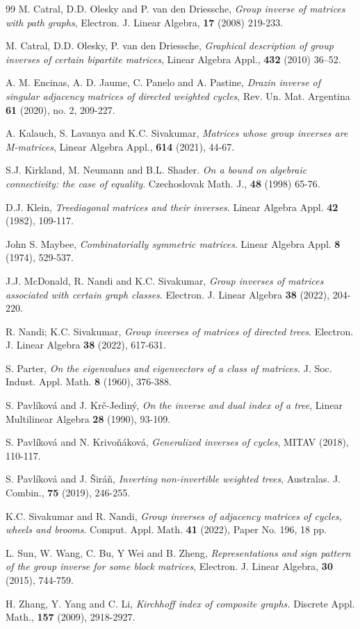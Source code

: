 \documentclass[notitlepage,12pt,reqno]{amsart}
\numberwithin{equation}{section}
\begin{document}
\begin{thebibliography}{99}
M. Catral, D.D. Olesky and P. van den Driessche, {\it Group inverse of matrices with path graphs}, Electron. J. Linear Algebra, {\bf 17} (2008) 219-233.

M. Catral, D.D. Olesky, P. van den Driessche, {\it Graphical description of group inverses of certain bipartite matrices}, Linear Algebra Appl., {\bf 432} (2010) 36–52.


A. M. Encinas, A. D. Jaume, C. Panelo and A. Pastine, {\it Drazin inverse of singular adjacency matrices of directed weighted cycles}, Rev. Un. Mat. Argentina {\bf 61} (2020), no. 2, 209-227.

A. Kalauch, S. Lavanya and K.C. Sivakumar, {\it Matrices whose group inverses are M-matrices}, Linear Algebra Appl., {\bf 614} (2021), 44-67.

S.J. Kirkland, M. Neumann and B.L. Shader. {\it On a bound on algebraic connectivity: the case of equality}. Czechoslovak Math. J., {\bf 48} (1998) 65-76.

D.J. Klein, {\it Treediagonal matrices and their inverses}. Linear Algebra Appl. {\bf 42} (1982), 109-117.

John S. Maybee, {\it Combinatorially symmetric matrices}. Linear Algebra Appl. {\bf 8} (1974), 529-537. 

J.J. McDonald, R. Nandi and K.C. Sivakumar, {\it Group inverses of matrices associated with certain graph classes}. Electron. J. Linear Algebra {\bf 38} (2022), 204-220.


R. Nandi; K.C. Sivakumar, {\it Group inverses of matrices of directed trees}. Electron. J. Linear Algebra {\bf 38} (2022), 617-631.

S. Parter, {\it On the eigenvalues and eigenvectors of a class of matrices.} J. Soc. Indust. Appl. Math. {\bf 8} (1960), 376-388.

S. Pavlíková and J. Kr\v{c}-Jedin{\'y}, {\it On the inverse and dual index of a tree}, Linear Multilinear Algebra {\bf 28} (1990), 93-109.

S. Pavl{\'i}kov{\'a} and N. Krivo\v{n}{\'a}kov{\'a}, {\it Generalized inverses of cycles}, MITAV (2018), 110-117.

S. Pavlíková and J. Širáň, {\it Inverting non-invertible weighted trees}, Australas. J. Combin., {\bf 75} (2019), 246-255.

K.C. Sivakumar and R. Nandi, {\it Group inverses of adjacency matrices of cycles, wheels and brooms}. Comput. Appl. Math. {\bf 41} (2022), Paper No. 196, 18 pp.

L. Sun, W. Wang, C. Bu, Y Wei and B. Zheng, {\it Representations and sign pattern of the group inverse for some block matrices}, Electron. J. Linear Algebra, {\bf 30} (2015), 744-759.

H. Zhang, Y. Yang and C. Li, {\it Kirchhoff index of composite graphs.} Discrete Appl. Math.,  {\bf 157} (2009), 2918-2927.


\end{thebibliography}
\end{document}
